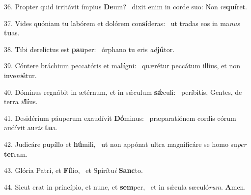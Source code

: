 36. Propter quid irritávit ímpius \textbf{De}um? \ast\  dixit enim in corde suo: Non \textit{re}\textbf{quí}ret.\

37. Vides quóniam tu labórem et dolórem con\textbf{sí}deras: \ast\  ut tradas eos in ma\textit{nus} \textbf{tu}as.\

38. Tibi derelíctus est \textbf{pau}per: \ast\  órphano tu eris \textit{ad}\textbf{jú}tor.\

39. Cóntere bráchium peccatóris et ma\textbf{lí}gni: \ast\  quærétur peccátum illíus, et non inve\textit{ni}\textbf{é}tur.\

40. Dóminus regnábit in ætérnum, et in sǽculum \textbf{sǽ}culi: \ast\  períbitis, Gentes, de terra \textit{il}\textbf{lí}us.\

41. Desidérium páuperum exaudívit \textbf{Dó}minus: \ast\  præparatiónem cordis eórum audívit au\textit{ris} \textbf{tu}a.\

42. Judicáre pupíllo et \textbf{hú}mili, \ast\  ut non appónat ultra magnificáre se homo su\textit{per} \textbf{ter}ram.\

43. Glória Patri, et \textbf{Fí}lio, \ast\  et Spirítu\textit{i} \textbf{Sanc}to.\

44. Sicut erat in princípio, et nunc, et \textbf{sem}per, \ast\  et in sǽcula sæculó\textit{rum}. \textbf{A}men.\

